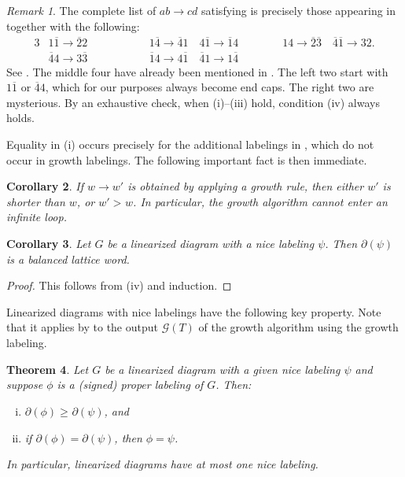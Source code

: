 \documentclass{amsart}
\newtheorem{theorem}{Theorem}[section]
\newtheorem{corollary}[theorem]{Corollary}
\theoremstyle{definition}
\theoremstyle{remark}
\newtheorem{remark}[theorem]{Remark}
\numberwithin{equation}{section}
\DeclareMathOperator{\tlex}{l\widetilde{ex}}
\begin{document}
\begin{remark}
    The complete list of $ab \to cd$ satisfying  is precisely those appearing in  together with the following:
    \begin{alignat*}{3}
        &1\overline{1} \to \overline{2}2\qquad\qquad
        && 1\overline{4} \to \overline{4}1
        \quad 4\overline{1} \to \overline{1}4\qquad\qquad
        14 \to \overline{2}\overline{3}
        \quad \overline{4}\overline{1} \to 32.
        \\
        &\overline{4}4 \to 3\overline{3}\qquad\qquad
        && \overline{1}4 \to 4\overline{1}
        \quad \overline{4}1 \to 1\overline{4}
    \end{alignat*}
    See \cite[\S8]{sl4-web-basis-code}. The middle four have already been mentioned in . The left two start with $1\overline{1}$ or $\overline{4}4$, which for our purposes always become end caps. The right two are mysterious. By an exhaustive check, when (i)--(iii) hold, condition (iv) always holds.
\end{remark}

Equality in (i) occurs precisely for the additional labelings in , which do not occur in growth labelings. The following important fact is then immediate. 
\begin{corollary}\label{cor:growth_no_cycles}
  If $w \to w'$ is obtained by applying a growth rule, then either $w'$ is shorter than $w$, or $w' >_{\tlex} w$. In particular, the growth algorithm cannot enter an infinite loop.
\end{corollary}


\begin{corollary}
    Let $G$ be a linearized diagram with a nice labeling $\psi$. Then $\partial(\psi)$ is a balanced lattice word.
\end{corollary}
\begin{proof}
    This follows from (iv) and induction.
\end{proof}

Linearized diagrams with nice labelings have the following key property. Note that it applies by  to the output $\mathcal{G}(T)$ of the growth algorithm using the growth labeling.

\begin{theorem}\label{thm:nice-unitriangularity}
  Let $G$ be a linearized diagram with a given nice labeling $\psi$ and suppose $\phi$ is a (signed) proper labeling of $G$. Then:
  \begin{enumerate}[(i)]
    \item $\partial(\phi) \geq_{\tlex} \partial(\psi)$, and
    \item if $\partial(\phi) = \partial(\psi)$, then $\phi = \psi$.
  \end{enumerate}
  In particular, linearized diagrams have at most one nice labeling.
\end{theorem}
\end{document}
